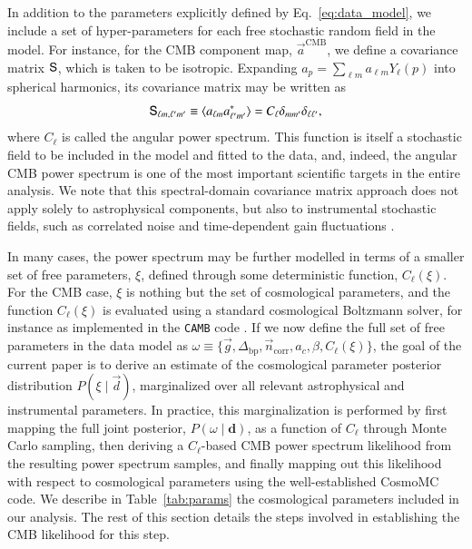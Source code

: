 \documentclass[onecolumn]{aa}
\renewcommand{\d}[0]{\vec{d}}
\newcommand{\n}[0]{\vec{n}}
\renewcommand{\a}[0]{\vec{a}}
\newcommand{\g}[0]{\vec{g}}
\renewcommand{\S}[0]{\tens{S}}
\begin{document}
In addition to the parameters explicitly defined by
Eq.~\eqref{eq:data_model}, we include a set of hyper-parameters for each
free stochastic random field in the model. For instance, for the CMB
component map, $\a^{\mathrm{CMB}}$, we define a covariance
matrix $\S$, which is taken to be isotropic. Expanding
$a_p=\sum_{\ell m} a_{\ell m}Y_\ell(p)$ into spherical harmonics,
its covariance matrix may be written as
\begin{equation}
  \label{eq:cov_harm}
  \S_{\ell m,\ell'm'}\equiv\langle a_{\ell m}a^{*}_{\ell'm'}\rangle=C_{\ell}
  \delta_{mm'}\delta_{\ell\ell'},
\end{equation}
where $C_\ell$ is called the angular power spectrum. This function
is itself a stochastic field to be included in the model and fitted to
the data, and, indeed, the angular CMB power spectrum is one of the
most important scientific targets in the entire analysis. We note that
this spectral-domain covariance matrix approach does not apply solely to
astrophysical components, but also to instrumental stochastic fields,
such as correlated noise \citep{bp06} and time-dependent gain fluctuations \citep{bp07}.

In many cases, the power spectrum may be further modelled in terms of
a smaller set of free parameters, $\xi$, defined through some
deterministic function, $C_{\ell}(\xi)$. For the CMB case, $\xi$ is
nothing but the set of cosmological parameters, and the function $C_{\ell}(\xi)$ is
evaluated using a standard cosmological Boltzmann solver, for instance as implemented
in the \texttt{CAMB} code \citep{Lewis:1999bs}. If we now define the
full set of free parameters in the data model as $\omega \equiv
\lbrace\g,\Delta_{\mathrm{bp}},\n_{\mathrm{corr}},a_c,\beta,
C_{\ell}(\xi)\rbrace$, the goal of the current paper is to derive an
estimate of the cosmological parameter posterior distribution
$P(\xi\mid\d)$, marginalized over all relevant astrophysical and
instrumental parameters. In practice, this marginalization is
performed by first mapping the full joint posterior, $P(\omega
\mid\mathbf{d})$, as a function of $C_{\ell}$ through Monte Carlo
sampling, then deriving a $C_{\ell}$-based CMB power spectrum likelihood from
the resulting power spectrum samples, and finally mapping out this
likelihood with respect to cosmological parameters using the
well-established CosmoMC \citep{cosmomc} code. We describe in
Table~\ref{tab:params} the cosmological parameters included in our analysis. 
The rest of this section details the steps involved in establishing 
the CMB likelihood for this step.
\end{document}
